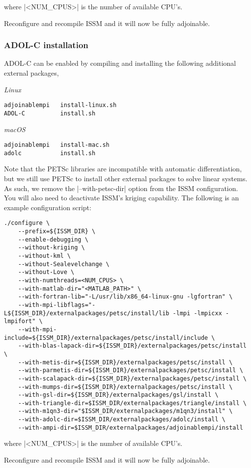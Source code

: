 where \lstinlinebg|<NUM_CPUS>| is the number of available CPU's.

Reconfigure and recompile ISSM and it will now be fully adjoinable.

\subsubsection{ADOL-C installation}
ADOL-C can be enabled by compiling and installing the following additional external packages,

\emph{Linux}
\begin{lstlisting}
adjoinablempi	install-linux.sh
ADOL-C			install.sh
\end{lstlisting}

\emph{macOS}
\begin{lstlisting}
adjoinablempi	install-mac.sh
adolc			install.sh
\end{lstlisting}

Note that the PETSc libraries are incompatible with automatic differentiation, but we still use PETSc to install other external packages to solve linear systems. As such, we remove the \lstinlinebg|--with-petsc-dir| option from the ISSM configuration. You will also need to deactivate
ISSM's kriging capability. The following is an example configuration script:

\begin{lstlisting}
./configure \
	--prefix=${ISSM_DIR} \
	--enable-debugging \
	--without-kriging \
	--without-kml \
	--without-Sealevelchange \
	--without-Love \
	--with-numthreads=<NUM_CPUS> \
	--with-matlab-dir="<MATLAB_PATH>" \
	--with-fortran-lib="-L/usr/lib/x86_64-linux-gnu -lgfortran" \
	--with-mpi-libflags="-L${ISSM_DIR}/externalpackages/petsc/install/lib -lmpi -lmpicxx -lmpifort" \
	--with-mpi-include=${ISSM_DIR}/externalpackages/petsc/install/include \
	--with-blas-lapack-dir=${ISSM_DIR}/externalpackages/petsc/install \
	--with-metis-dir=${ISSM_DIR}/externalpackages/petsc/install \
	--with-parmetis-dir=${ISSM_DIR}/externalpackages/petsc/install \
	--with-scalapack-dir=${ISSM_DIR}/externalpackages/petsc/install \
	--with-mumps-dir=${ISSM_DIR}/externalpackages/petsc/install \
	--with-gsl-dir=${ISSM_DIR}/externalpackages/gsl/install \
	--with-triangle-dir=$ISSM_DIR/externalpackages/triangle/install \
	--with-m1qn3-dir="$ISSM_DIR/externalpackages/m1qn3/install" \
	--with-adolc-dir=$ISSM_DIR/externalpackages/adolc/install \
	--with-ampi-dir=$ISSM_DIR/externalpackages/adjoinablempi/install
\end{lstlisting}

where \lstinlinebg|<NUM_CPUS>| is the number of available CPU's.

Reconfigure and recompile ISSM and it will now be fully adjoinable.

\clearpage %

